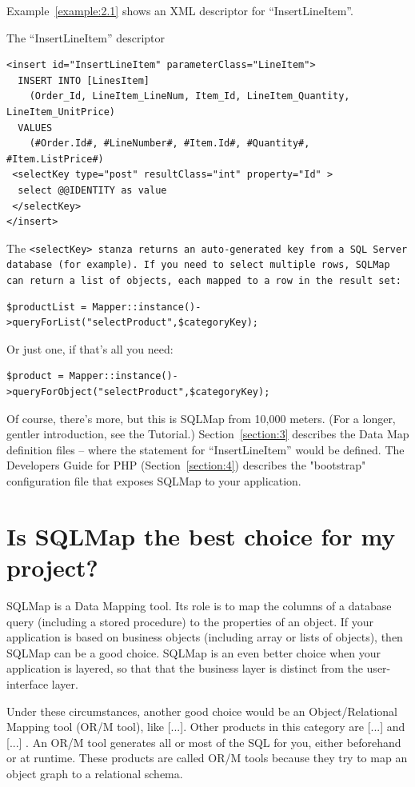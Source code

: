 Example~\ref{example:2.1} shows an XML descriptor for ``InsertLineItem''.
\begin{example}\label{example:2.1}
The ``InsertLineItem'' descriptor
\begin{verbatim}
<insert id="InsertLineItem" parameterClass="LineItem">
  INSERT INTO [LinesItem]
    (Order_Id, LineItem_LineNum, Item_Id, LineItem_Quantity, LineItem_UnitPrice)
  VALUES
    (#Order.Id#, #LineNumber#, #Item.Id#, #Quantity#, #Item.ListPrice#)
 <selectKey type="post" resultClass="int" property="Id" >
  select @@IDENTITY as value
 </selectKey>
</insert>
\end{verbatim}
\end{example}

The \tt{<selectKey>} stanza returns an auto-generated key from a SQL Server
database (for example). If you need to select multiple rows, SQLMap can return
a list of objects, each mapped to a row in the result set:
\begin{verbatim}
$productList = Mapper::instance()->queryForList("selectProduct",$categoryKey);
\end{verbatim}
Or just one, if that's all you need:
\begin{verbatim}
$product = Mapper::instance()->queryForObject("selectProduct",$categoryKey);
\end{verbatim}

Of course, there's more, but this is SQLMap from 10,000 meters. (For a longer,
gentler introduction, see the Tutorial.) Section~\ref{section:3} describes the
Data Map definition files -- where the statement for ``InsertLineItem'' would
be defined. The Developers Guide for PHP (Section~\ref{section:4}) describes
the "bootstrap" configuration file that exposes SQLMap to your application.

\section{Is SQLMap the best choice for my project?}
SQLMap is a Data Mapping tool. Its role is to map the columns of a database
query (including a stored procedure) to the properties of an object. If your
application is based on business objects (including array or lists of
objects), then SQLMap can be a good choice. SQLMap is an even better choice
when your application is layered, so that that the business layer is distinct
from the user-interface layer.

Under these circumstances, another good choice would be an Object/Relational
Mapping tool (OR/M tool), like [...]. Other products in this category are
[...] and [...] . An OR/M tool generates all or most of the SQL for you,
either beforehand or at runtime. These products are called OR/M tools because
they try to map an object graph to a relational schema.


